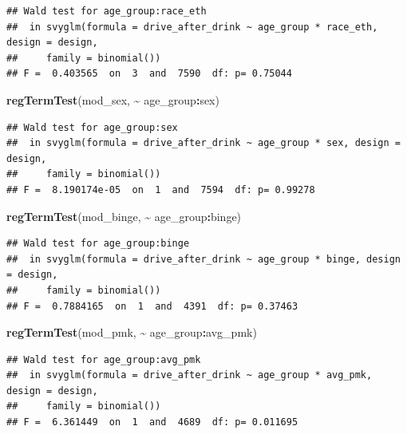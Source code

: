 \documentclass[
]{article}
\newenvironment{Shaded}{\begin{snugshade}}{\end{snugshade}}
\newcommand{\FunctionTok}[1]{\textcolor[rgb]{0.13,0.29,0.53}{\textbf{#1}}}
\newcommand{\NormalTok}[1]{#1}
\newcommand{\SpecialCharTok}[1]{\textcolor[rgb]{0.81,0.36,0.00}{\textbf{#1}}}
\begin{document}
\begin{verbatim}
## Wald test for age_group:race_eth
##  in svyglm(formula = drive_after_drink ~ age_group * race_eth, design = design, 
##     family = binomial())
## F =  0.403565  on  3  and  7590  df: p= 0.75044
\end{verbatim}

\begin{Shaded}
\begin{Highlighting}[]
\FunctionTok{regTermTest}\NormalTok{(mod\_sex, }\SpecialCharTok{\textasciitilde{}}\NormalTok{ age\_group}\SpecialCharTok{:}\NormalTok{sex)}
\end{Highlighting}
\end{Shaded}

\begin{verbatim}
## Wald test for age_group:sex
##  in svyglm(formula = drive_after_drink ~ age_group * sex, design = design, 
##     family = binomial())
## F =  8.190174e-05  on  1  and  7594  df: p= 0.99278
\end{verbatim}

\begin{Shaded}
\begin{Highlighting}[]
\FunctionTok{regTermTest}\NormalTok{(mod\_binge, }\SpecialCharTok{\textasciitilde{}}\NormalTok{ age\_group}\SpecialCharTok{:}\NormalTok{binge) }
\end{Highlighting}
\end{Shaded}

\begin{verbatim}
## Wald test for age_group:binge
##  in svyglm(formula = drive_after_drink ~ age_group * binge, design = design, 
##     family = binomial())
## F =  0.7884165  on  1  and  4391  df: p= 0.37463
\end{verbatim}

\begin{Shaded}
\begin{Highlighting}[]
 \FunctionTok{regTermTest}\NormalTok{(mod\_pmk, }\SpecialCharTok{\textasciitilde{}}\NormalTok{ age\_group}\SpecialCharTok{:}\NormalTok{avg\_pmk) }
\end{Highlighting}
\end{Shaded}

\begin{verbatim}
## Wald test for age_group:avg_pmk
##  in svyglm(formula = drive_after_drink ~ age_group * avg_pmk, design = design, 
##     family = binomial())
## F =  6.361449  on  1  and  4689  df: p= 0.011695
\end{verbatim}
\end{document}
